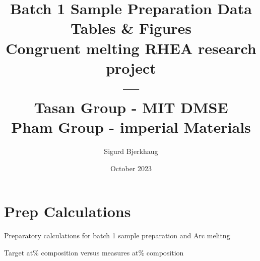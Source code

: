 \documentclass[a4]{article}
\title{Batch 1 Sample Preparation Data Tables \& Figures \\ Congruent melting RHEA research project \\ ---\\Tasan Group - MIT DMSE \\ Pham Group - imperial Materials \\}
\author{Sigurd Bjerkhaug}
\date{October 2023}
\begin{document}
\maketitle

\newpage




\section{Prep Calculations}


\begin{table}[h]
    \centering
    \caption{Preparatory calculations for batch 1 sample preparation and Arc melitng}
    
    \label{tab:Batch1 preparation}
\end{table}


\newpage

\begin{table}[h]
    \centering
    \caption{Target at\% composition versus measures at\% composition}
    
    \label{tab:Batch1 comparison}
\end{table}
\end{document}

